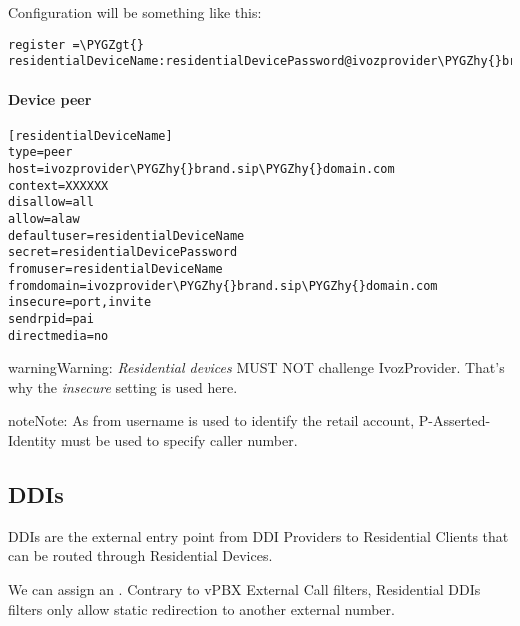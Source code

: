 \documentclass[letterpaper,10pt,english]{sphinxmanual}
\def\PYGZgt{\char`\>}
\def\PYGZhy{\char`\-}
\begin{document}
Configuration will be something like this:

\begin{Verbatim}[commandchars=\\\{\}]
register =\PYGZgt{} residentialDeviceName:residentialDevicePassword@ivozprovider\PYGZhy{}brand.sip\PYGZhy{}domain.com
\end{Verbatim}


\paragraph{Device peer}
\label{administration_portal/client/residential/residential_devices:device-peer}
\begin{Verbatim}[commandchars=\\\{\}]
[residentialDeviceName]
type=peer
host=ivozprovider\PYGZhy{}brand.sip\PYGZhy{}domain.com
context=XXXXXX
disallow=all
allow=alaw
defaultuser=residentialDeviceName
secret=residentialDevicePassword
fromuser=residentialDeviceName
fromdomain=ivozprovider\PYGZhy{}brand.sip\PYGZhy{}domain.com
insecure=port,invite
sendrpid=pai
directmedia=no
\end{Verbatim}

\begin{notice}{warning}{Warning:}
\emph{Residential devices} MUST NOT challenge IvozProvider. That's
why the \emph{insecure} setting is used here.
\end{notice}

\begin{notice}{note}{Note:}
As from username is used to identify the retail account, P-Asserted-Identity must be used to specify caller number.
\end{notice}


\subsection{DDIs}
\label{administration_portal/client/residential/ddis:ddis}\label{administration_portal/client/residential/ddis:residential-ddis}\label{administration_portal/client/residential/ddis::doc}
DDIs are the external entry point from DDI Providers to Residential Clients that
can be routed through Residential Devices.

We can assign an {\hyperref[administration_portal/client/vpbx/routing_tools/external_call_filters:external\string-call\string-filters]{}}. Contrary to vPBX External Call filters, Residential DDIs
filters only allow static redirection to another external number.
\end{document}
